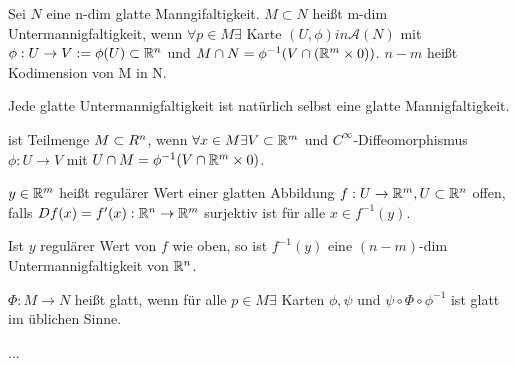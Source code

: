 \begin{defi}[Untermannigfaltigkeit]
	Sei $N$ eine n-dim glatte Manngifaltigkeit. 
	$M\subset N$ heißt m-dim Untermannigfaltigkeit, wenn $\forall p\in M \exists$
	Karte $(U,\phi) in \mathcal{A}(N)$ mit $\phi:U\to V:=\phi(U)\subset \mathbb R^n$
	und $M\cap N = \phi^{-1}(V\cap(\mathbb R^m\times {0}))$.
	$n-m$ heißt Kodimension von M in N.
\end{defi}

\begin{bem}
	Jede glatte Untermannigfaltigkeit ist natürlich selbst eine glatte Mannigfaltigkeit.
\end{bem}

\begin{defi}
	ist Teilmenge $M\subset \\R^n$, wenn $\forall x\in M \exists V\subset \mathbb R^m$
	und $C^\infty$-Diffeomorphismus $\phi:U\to V$ mit $U\cap M=\phi^{-1}(V\cap\mathbb R^m\times{0})$.
\end{defi}

\begin{defi}
	$y\in\mathbb R^m$ heißt regulärer Wert einer glatten Abbildung $f:U\to\mathbb R^m, U\subset\mathbb R^n$ offen,
	falls $Df(x)=f'(x):\mathbb R^n\to\mathbb R^m$ surjektiv ist für alle $x\in f^{-1}(y)$.
\end{defi}

\begin{satz}
	Ist $y$ regulärer Wert von $f$ wie oben, 
	so ist $f^{-1}(y)$ eine $(n-m)$-dim Untermannigfaltigkeit von $\mathbb R^n$.
\end{satz}

\begin{defi}
	$\Phi:M\to N$ heißt glatt, wenn für alle $p\in M \exists$ Karten $\phi,\psi$ und
	$\psi\circ\Phi\circ\phi^{-1}$ ist glatt im üblichen Sinne. 
\end{defi}

\begin{satz}
	... %
\end{satz}
